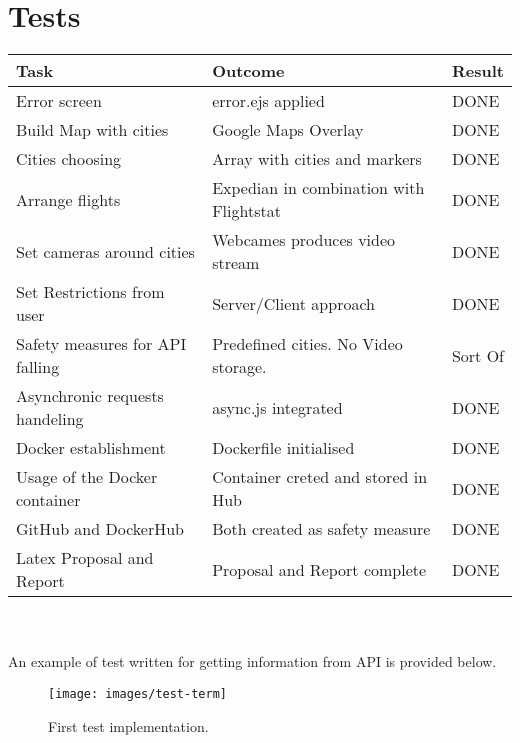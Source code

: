 \documentclass[12pt]{article}
\numberwithin{equation}{section} %
\numberwithin{figure}{section} %
\numberwithin{table}{section} %
\begin{document}
\section{Tests}	
	\begin{tabularx}{\textwidth}{X|l|l}
		\textbf{Task} & \textbf{Outcome} & Result \\
		\hline
		Error screen & error.ejs applied & \cellcolor{green!25}DONE\\
		\hline
		Build Map with cities & Google Maps Overlay & \cellcolor{green!25}DONE\\
		\hline
		Cities choosing & Array with cities and markers & \cellcolor{green!25}DONE\\
		\hline
		Arrange flights & Expedian in combination with Flightstat & \cellcolor{green!25}DONE\\
		\hline
		Set cameras around cities & Webcames produces video stream & \cellcolor{green!25}DONE\\
		\hline
		Set Restrictions from user & Server/Client approach & \cellcolor{green!25}DONE\\
		\hline
		Safety measures for API falling & Predefined cities. No Video storage. & \cellcolor{green!10}Sort Of\\
		\hline
		Asynchronic requests handeling & async.js integrated & \cellcolor{green!25}DONE\\
		\hline
		Docker establishment & Dockerfile initialised & \cellcolor{green!25}DONE\\
		\hline
		Usage of the Docker container & Container creted and stored in Hub & \cellcolor{green!25}DONE\\
		\hline		
		GitHub and DockerHub & Both created as safety measure & \cellcolor{green!25}DONE\\
		\hline
		Latex Proposal and Report & Proposal and Report complete & \cellcolor{green!25}DONE\\
		\hline
	\end{tabularx}
	 \\ \\
	An example of test written for getting information from API is provided below.
	\begin{figure}[H]
		\centering		
		\texttt{[image: images/test-term]}
		\caption{First test implementation.}
		
	\end{figure}
\begin{flushleft}
	
	
\end{flushleft}
\end{document}
